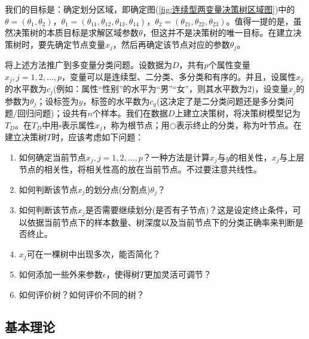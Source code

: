         我们的目标是：确定划分区域，即确定图(\ref{fig:连续型两变量决策树区域图})中的$\theta = (\theta_1,\theta_2)$，$\theta_1 = (\theta_{11},\theta_{12},\theta_{13},\theta_{14})$，$\theta_2 = (\theta_{21},\theta_{22},\theta_{23})$。值得一提的是，虽然决策树的本质目标是求解区域参数$\theta$，但这并不是决策树的唯一目标。在建立决策树时，要先确定节点变量$x_j$，然后再确定该节点对应的参数$\theta_j$。
        \par
        将上述方法推广到多变量分类问题。设数据为$D$，共有$p$个属性变量$x_j,j=1,2,\dots,p$，变量可以是连续型、二分类、多分类和有序的。并且，设属性$x_j$的水平数为$c_j$(例如：属性“性别”的水平为“男”“女”，则其水平数为2)，设变量$x_j$的参数为$\theta_j$；设标签为$y$，标签的水平数为$c_y$(这决定了是二分类问题还是多分类问题/回归问题)；设共有$n$个样本。我们在数据$D$上建立决策树，将决策树模型记为$T_D$。在$T_D$中用$\square$表示属性$x_j$，称为根节点；用$\bigcirc$表示终止的分类，称为叶节点。在建立决策树$T$时，应该考虑如下问题：
        \begin{enumerate}
        \item 如何确定当前节点$x_j,j=1,2,\dots,p$？一种方法是计算$x_j$与$y$的相关性，$x_j$与上层节点的相关性，将相关性高的放在当前节点。不过要注意共线性。
        \item 如何判断该节点$x_j$的划分点(分割点)$\theta_j$？
        \item 如何判断该节点$x_j$是否需要继续划分(是否有子节点)？这是设定终止条件，可以依据当前节点下的样本数量、树深度以及当前节点下的分类正确率来判断是否终止。
        \item $x_j$可在一棵树中出现多次，能否简化？
        \item 如何添加一些外来参数$\epsilon$，使得树$T$更加灵活可调节？
        \item 如何评价树？如何评价不同的树？
        \end{enumerate}

    \subsection{基本理论}
